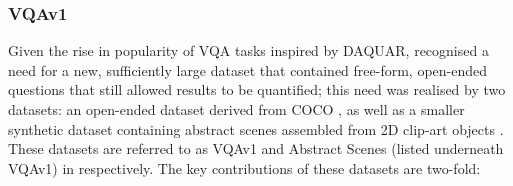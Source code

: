 


\subsubsection{VQAv1}

Given the rise in popularity of VQA tasks inspired by DAQUAR, \citeauthor{antol2015vqa} recognised a need for a new, sufficiently large dataset that contained free-form, open-ended questions that still allowed results to be quantified; this need was realised by two datasets: an open-ended dataset derived from COCO \cite{lin2014microsoft}, as well as a smaller synthetic dataset containing abstract scenes assembled from 2D clip-art objects \cite{zitnick2013bringing}. These datasets are referred to as VQAv1 and Abstract Scenes (listed underneath VQAv1) in \tableautorefname{ \ref{tab:dataset_comparison}} respectively. The key contributions of these datasets are two-fold:

